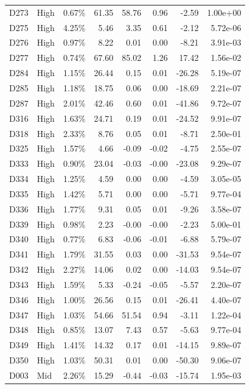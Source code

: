 \begin{tabular}{l l r r r r r r}
D273 & High & 0.67\% & 61.35 & 58.76 & 0.96 & -2.59 & 1.00e+00 \\
D275 & High & 4.25\% & 5.46 & 3.35 & 0.61 & -2.12 & 5.72e-06 \\
D276 & High & 0.97\% & 8.22 & 0.01 & 0.00 & -8.21 & 3.91e-03 \\
D277 & High & 0.74\% & 67.60 & 85.02 & 1.26 & 17.42 & 1.56e-02 \\
D284 & High & 1.15\% & 26.44 & 0.15 & 0.01 & -26.28 & 5.19e-07 \\
D285 & High & 1.18\% & 18.75 & 0.06 & 0.00 & -18.69 & 2.21e-07 \\
D287 & High & 2.01\% & 42.46 & 0.60 & 0.01 & -41.86 & 9.72e-07 \\
D316 & High & 1.63\% & 24.71 & 0.19 & 0.01 & -24.52 & 9.91e-07 \\
D318 & High & 2.33\% & 8.76 & 0.05 & 0.01 & -8.71 & 2.50e-01 \\
D325 & High & 1.57\% & 4.66 & -0.09 & -0.02 & -4.75 & 2.55e-07 \\
D333 & High & 0.90\% & 23.04 & -0.03 & -0.00 & -23.08 & 9.29e-07 \\
D334 & High & 1.25\% & 4.59 & 0.00 & 0.00 & -4.59 & 3.05e-05 \\
D335 & High & 1.42\% & 5.71 & 0.00 & 0.00 & -5.71 & 9.77e-04 \\
D336 & High & 1.77\% & 9.31 & 0.05 & 0.01 & -9.26 & 3.58e-07 \\
D339 & High & 0.98\% & 2.23 & -0.00 & -0.00 & -2.23 & 5.00e-01 \\
D340 & High & 0.77\% & 6.83 & -0.06 & -0.01 & -6.88 & 5.79e-07 \\
D341 & High & 1.79\% & 31.55 & 0.03 & 0.00 & -31.53 & 9.54e-07 \\
D342 & High & 2.27\% & 14.06 & 0.02 & 0.00 & -14.03 & 9.54e-07 \\
D343 & High & 1.59\% & 5.33 & -0.24 & -0.05 & -5.57 & 2.20e-07 \\
D346 & High & 1.00\% & 26.56 & 0.15 & 0.01 & -26.41 & 4.40e-07 \\
D347 & High & 1.03\% & 54.66 & 51.54 & 0.94 & -3.11 & 1.22e-04 \\
D348 & High & 0.85\% & 13.07 & 7.43 & 0.57 & -5.63 & 9.77e-04 \\
D349 & High & 1.41\% & 14.32 & 0.17 & 0.01 & -14.15 & 9.89e-07 \\
D350 & High & 1.03\% & 50.31 & 0.01 & 0.00 & -50.30 & 9.06e-07 \\
D003 & Mid & 2.26\% & 15.29 & -0.44 & -0.03 & -15.74 & 1.95e-03 \\

\end{tabular}
